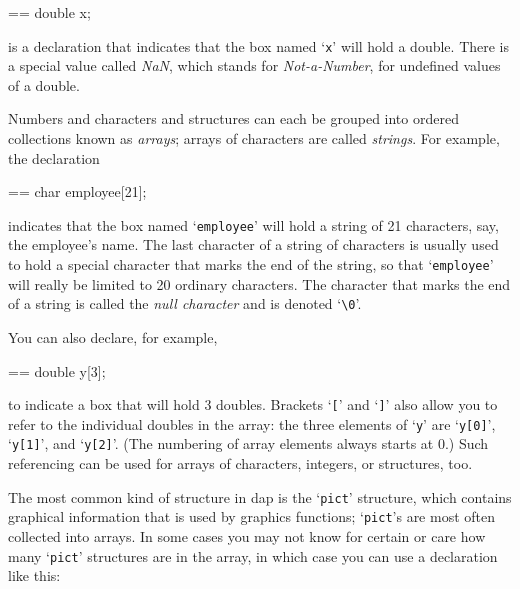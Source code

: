 \documentclass{book}
\makeatletter
\newenvironment{Texinfopreformatted}{%
  \par\GNUTobeylines\obeyspaces\frenchspacing\parskip=\z@\parindent=\z@}{}
{\catcode`\^^M=13 \gdef\GNUTobeylines{\catcode`\^^M=13 \def^^M{\null\par}}}
\newenvironment{Texinfoindented}{\begin{list}{}{}\item\relax}{\end{list}}
\renewcommand{\_}{\Texinfounderscore\discretionary{}{}{}}
\makeatother
\begin{document}
\begin{Texinfoindented}
\begin{Texinfopreformatted}%
\ttfamily double x;
\end{Texinfopreformatted}
\end{Texinfoindented}
\noindent{}is a declaration that
indicates that the box named `\texttt{x}' will hold a double.
There is a special value called \textsl{NaN},
%
which stands for \textsl{Not-a-Number}, for undefined values
of a double.

Numbers and characters and structures can each be grouped into
ordered collections known as \textsl{arrays};
%
arrays of characters
are called \textsl{strings}.
%
For example, the declaration

\begin{Texinfoindented}
\begin{Texinfopreformatted}%
\ttfamily char employee[21];
\end{Texinfopreformatted}
\end{Texinfoindented}
\noindent{}indicates that the box named `\texttt{employee}' will hold a
string of 21 characters, say, the employee's name.
The last character of a string of characters is usually used to hold
a special character that marks the end of the string, so that `\texttt{employee}'
will really be limited to 20 ordinary characters.
The character that marks the end of a string is called the
\textsl{null character} and is denoted `\texttt{\textbackslash{}0}'.

You can also declare, for example,

\begin{Texinfoindented}
\begin{Texinfopreformatted}%
\ttfamily double y[3];
\end{Texinfopreformatted}
\end{Texinfoindented}
\noindent{}to indicate a box that will hold 3 doubles.
Brackets `\texttt{[}' and `\texttt{]}' also allow you to
refer to the individual doubles in the array: the three elements
of `\texttt{y}' are `\texttt{y[0]}', `\texttt{y[1]}', and `\texttt{y[2]}'.
(The numbering of array elements always starts at 0.)
Such referencing can be used for arrays of characters, integers, or
structures, too.

The most common kind of structure in dap is the `\texttt{pict}' structure,
which contains graphical information that
is used by graphics functions; `\texttt{pict}'s are
most often collected into arrays.
In some cases you may not know for certain or care how many
`\texttt{pict}' structures are in the array, in which case you can use
a declaration like this:
\end{document}
